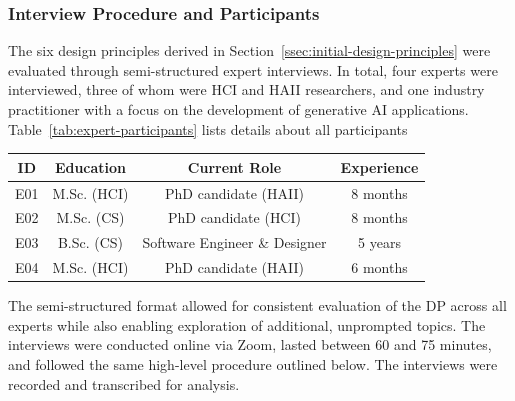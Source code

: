 \subsubsection{Interview Procedure and Participants} \label{sssec:interview-procedure}

The six design principles derived in Section~\ref{ssec:initial-design-principles} were evaluated through semi-structured expert interviews. In total, four experts were interviewed, three of whom were \ac{HCI} and \ac{HAII} researchers, and one industry practitioner with a focus on the development of generative AI applications. Table~\ref{tab:expert-participants} lists details about all participants

\begin{ctable}
    \centering
    \begin{tabular}{c c c c}
        \toprule
        \textbf{ID} & \textbf{Education} & \textbf{Current Role} & \textbf{Experience} \\
        \midrule
        E01 & M.Sc. (\acs{HCI}) & PhD candidate (\acs{HAII}) & 8 months \\
        E02 & M.Sc. (CS) & PhD candidate (\acs{HCI}) & 8 months \\
        E03 & B.Sc. (CS) & Software Engineer \& Designer & 5 years \\
        E04 & M.Sc. (\acs{HCI}) & PhD candidate (\acs{HAII}) & 6 months \\
        \bottomrule
    \end{tabular}
    \caption[Expert interview participants]{Overview of the four experts, including highest degree of education, current professional role, and years of experience in their current role.}
    \label{tab:expert-participants}
\end{ctable}

The semi-structured format allowed for consistent evaluation of the \ac{DP} across all experts while also enabling exploration of additional, unprompted topics. The interviews were conducted online via Zoom, lasted between 60 and 75 minutes, and followed the same high-level procedure outlined below. The interviews were recorded and transcribed for analysis.

